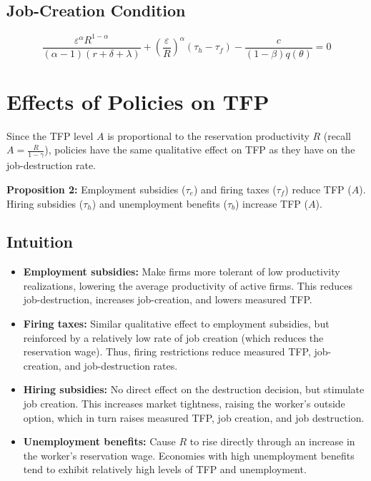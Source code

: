\documentclass[11pt]{article}
\begin{document}
\subsection{Job-Creation Condition}
\begin{equation}
\frac{\varepsilon^\alpha R^{1-\alpha}}{(\alpha - 1)(r + \delta + \lambda)} + \left(\frac{\varepsilon}{R}\right)^\alpha (\tau_h - \tau_f) - \frac{c}{(1-\beta)q(\theta)} = 0
\end{equation}

\section{Effects of Policies on TFP}
Since the TFP level $A$ is proportional to the reservation productivity $R$ (recall $A = \frac{R}{1-\gamma}$), policies have the same qualitative effect on TFP as they have on the job-destruction rate.

\textbf{Proposition 2:} Employment subsidies ($\tau_e$) and firing taxes ($\tau_f$) reduce TFP ($A$). Hiring subsidies ($\tau_h$) and unemployment benefits ($\tau_b$) increase TFP ($A$).

\subsection{Intuition}
\begin{itemize}
    \item \textbf{Employment subsidies:} Make firms more tolerant of low productivity realizations, lowering the average productivity of active firms. This reduces job-destruction, increases job-creation, and lowers measured TFP.
    \item \textbf{Firing taxes:} Similar qualitative effect to employment subsidies, but reinforced by a relatively low rate of job creation (which reduces the reservation wage). Thus, firing restrictions reduce measured TFP, job-creation, and job-destruction rates.
    \item \textbf{Hiring subsidies:} No direct effect on the destruction decision, but stimulate job creation. This increases market tightness, raising the worker's outside option, which in turn raises measured TFP, job creation, and job destruction.
    \item \textbf{Unemployment benefits:} Cause $R$ to rise directly through an increase in the worker's reservation wage. Economies with high unemployment benefits tend to exhibit relatively high levels of TFP and unemployment.
\end{itemize}
\end{document}
